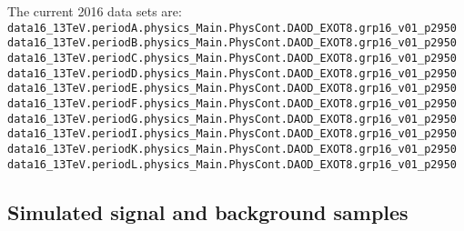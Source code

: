 The current 2016 data sets are:
\noindent
\\
{\scriptsize
\verb|data16_13TeV.periodA.physics_Main.PhysCont.DAOD_EXOT8.grp16_v01_p2950|\\
\verb|data16_13TeV.periodB.physics_Main.PhysCont.DAOD_EXOT8.grp16_v01_p2950|\\
\verb|data16_13TeV.periodC.physics_Main.PhysCont.DAOD_EXOT8.grp16_v01_p2950|\\
\verb|data16_13TeV.periodD.physics_Main.PhysCont.DAOD_EXOT8.grp16_v01_p2950|\\
\verb|data16_13TeV.periodE.physics_Main.PhysCont.DAOD_EXOT8.grp16_v01_p2950|\\
\verb|data16_13TeV.periodF.physics_Main.PhysCont.DAOD_EXOT8.grp16_v01_p2950|\\
\verb|data16_13TeV.periodG.physics_Main.PhysCont.DAOD_EXOT8.grp16_v01_p2950|\\
\verb|data16_13TeV.periodI.physics_Main.PhysCont.DAOD_EXOT8.grp16_v01_p2950|\\
\verb|data16_13TeV.periodK.physics_Main.PhysCont.DAOD_EXOT8.grp16_v01_p2950|\\
\verb|data16_13TeV.periodL.physics_Main.PhysCont.DAOD_EXOT8.grp16_v01_p2950|
}


\subsection{Simulated signal and background samples}



